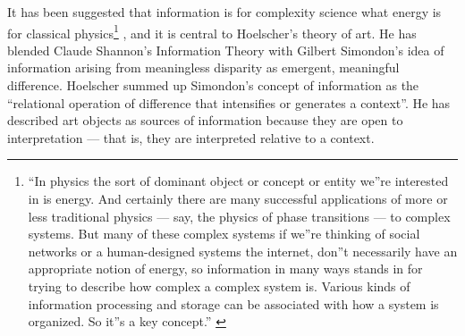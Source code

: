 \documentclass[letterpaper]{article}
\begin{document}
    It has been suggested that information is for complexity science what energy is for classical physics\footnote{
        “In physics the sort of dominant object or concept or entity we”re interested in is energy. And certainly there are many successful applications of more or less traditional physics — say, the physics of phase transitions — to complex systems. But many of these complex systems if we”re thinking of social networks or a human-designed systems the internet, don”t necessarily have an appropriate notion of energy, so information in many ways stands in for trying to describe how complex a complex system is. Various kinds of information processing and storage can be associated with how a system is organized.  So it”s a key concept.” \citep[0:52]{CrutchfieldIntrdctnToCmplxty2018}
    } \citep{CrutfieldRtAlSgntrsOfInfnty2015}, and it is central to Hoelscher's theory of art. He has blended Claude Shannon's Information Theory with Gilbert Simondon's idea of information arising from meaningless disparity as emergent, meaningful difference. Hoelscher summed up Simondon's concept of information as the “relational operation of difference that intensifies or generates a context”. He has described art objects as sources of information because they are open to interpretation — that is, they are interpreted relative to a context. 
    
    

    
\end{document}
